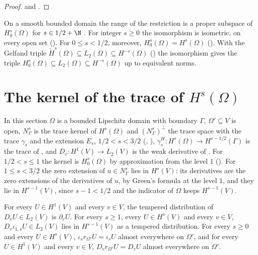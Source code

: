 \begin{proof}
\leanok
{} and .
\end{proof}

On a smooth bounded domain the range of the restriction is a proper subspace of
$H^s_0(\Omega)$ for $s \in 1/2 + \N$ \cite[Remark 2.5]{HewettMoiola}. For integer $s \geq 0$ the
isomorphism is isometric, on every open set (). For
$0 \leq s < 1/2$, moreover, $H^s_0(\Omega) = H^s(\Omega)$ (). With
the Gelfand triple $\tilde H^s(\Omega) \subseteq L_2(\Omega) \subseteq H^{-s}(\Omega)$
() the isomorphism gives the triple
$H^s_0(\Omega) \subseteq L_2(\Omega) \subseteq H^{-s}(\Omega)$ up to equivalent norms.

\section{The kernel of the trace of \texorpdfstring{$H^s(\Omega)$}{H\^{}s(Ω)}}
\label{sec:sobolev-trace-kernel}

In this section $\Omega$ is a bounded Lipschitz domain with boundary $\Gamma$, $\Omega' \subseteq V$
is open, $N^s_\Gamma$ is the trace kernel of $H^s(\Omega)$ and $(N^s_\Gamma)^\perp$ the trace
space with the trace $\gamma_s$ and the extension $E_s$, $1/2 < s < 3/2$
(, ),
$\gamma^H_s \colon H^s(\Omega) \to H^{s-1/2}(\Gamma)$ is the trace of
, and $D_v \colon H^1(V) \to L_2(V)$ is the weak
derivative of . For $1/2 < s \leq 1$ the kernel is
$H^s_0(\Omega)$ by approximation from the level $1$ (). For
$1 \leq s < 3/2$ the zero extension of $u \in N^s_\Gamma$ lies in $H^s(V)$: its derivatives are the
zero extensions of the derivatives of $u$, by Green's formula at the level $1$, and they lie in
$H^{s-1}(V)$, since $s - 1 < 1/2$ and the indicator of $\Omega$ keeps $H^{s-1}(V)$.

\begin{lemma}
\label{lem:sobolev-l2-weak-derivatives}
\leanok
{}
For every $U \in H^1(V)$ and every $v \in V$, the tempered distribution of
$D_v U \in L_2(V)$ is $\partial_v U$. For every $s \geq 1$, every $U \in H^s(V)$ and every
$v \in V$, $D_v \iota_{1,s} U \in L_2(V)$ lies in $H^{s-1}(V)$ as a tempered distribution. For
every $s \geq 0$ and every $U \in H^s(V)$, $\iota_s r_{\Omega'} U = \iota_s U$ almost everywhere
on $\Omega'$, and for every $U \in H^1(V)$ and every $v \in V$, $D_v r_{\Omega'} U = D_v U$
almost everywhere on $\Omega'$.
\end{lemma}

